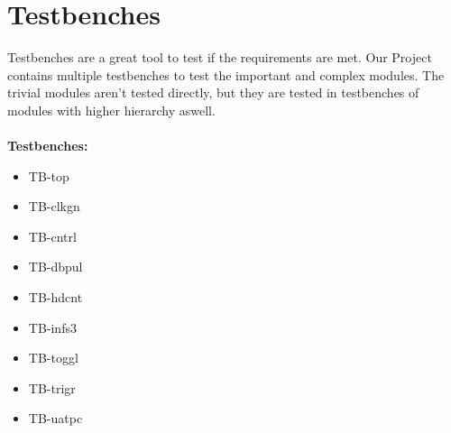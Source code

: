 \documentclass[12pt,a4 paper] {report}
\begin{document}
\newpage

\chapter{Testbenches}
Testbenches are a great tool to test if the requirements are met. Our Project contains multiple testbenches to test the
important and complex modules. The trivial modules aren't tested directly, but they are tested in testbenches of modules 
with higher hierarchy aswell. \\ \\
\textbf{Testbenches:}
\begin{itemize}
	\item TB-top
	\item TB-clkgn
	\item TB-cntrl
	\item TB-dbpul
	\item TB-hdcnt
	\item TB-infs3
	\item TB-toggl
	\item TB-trigr
	\item TB-uatpc
\end{itemize}

\newpage
\end{document}
